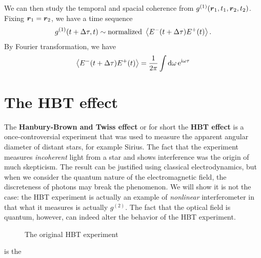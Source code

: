 \documentclass[hyperref, a4paper]{article}
\newcommand*{\ii}{\mathrm{i}}
\newcommand*{\ee}{\mathrm{e}}
\newcommand*{\concept}[1]{{\textbf{#1}}}
\begin{document}
We can then study the temporal and spacial coherence from $g^{(1)}(\vb*{r}_1, t_1, \vb*{r}_2, t_2)$.
Fixing $\vb*{r}_1 = \vb*{r}_2$, we have a time sequence 
\[
    g^{(1)}(t + \Delta \tau, t) \sim \text{normalized } \expval{E^-(t + \Delta\tau) E^+(t) }.
\]
By Fourier transformation, we have 
\[
    \expval{E^-(t + \Delta\tau) E^+(t) } = \frac{1}{2\pi} \int \dd{\omega} \ee^{\ii \omega \tau} 
\]

\section{The HBT effect}

The \concept{Hanbury-Brown and Twiss effect} or for short the \concept{HBT effect} is a once-controversial experiment that was used to measure the apparent angular diameter of distant stars, for example Sirius.
The fact that the experiment measures \emph{incoherent} light from a star and shows interference was the origin of much skepticism.
The result can be justified using classical electrodynamics, but when we consider the quantum nature of the electromagnetic field, 
the discreteness of photons may break the phenomenon. 
We will show it is not the case: the HBT experiment is actually an example of \emph{nonlinear} interferometer in that what it measures is actually $g^{(2)}$.
The fact that the optical field is quantum, however, can indeed alter the behavior of the HBT experiment.

\begin{figure}
    \centering
    
    \caption{The original HBT experiment}
    \label{fig:original-hbt}
\end{figure}

 is the 
\end{document}
